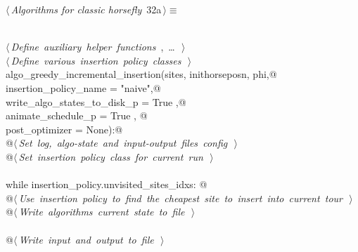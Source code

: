 \documentclass[11.5pt]{report}
\begin{document}
\begin{flushleft} \small\label{scrap33}\raggedright\small
{} $\langle\,${\itshape Algorithms for classic horsefly}\nobreak\ {\footnotesize {32a}}$\,\rangle\equiv$
\vspace{-1ex}
\begin{list}{}{} \item
\mbox{}\verb@@\\
\mbox{}\verb@@\hbox{$\langle\,${\itshape Define auxiliary helper functions}\nobreak\ {\footnotesize {}, \ldots\ }$\,\rangle$}\verb@@\\
\mbox{}\verb@@\hbox{$\langle\,${\itshape Define various insertion policy classes}\nobreak\ {\footnotesize {}}$\,\rangle$}\verb@@\\
\mbox{}\verb@def algo_greedy_incremental_insertion(sites, inithorseposn, phi,@\\
\mbox{}\verb@                                      insertion_policy_name       = "naive",@\\
\mbox{}\verb@                                      write_algo_states_to_disk_p = True   ,@\\
\mbox{}\verb@                                      animate_schedule_p          = True   , @\\
\mbox{}\verb@                                      post_optimizer              = None):@\\
\mbox{}\verb@      @\hbox{$\langle\,${\itshape Set log, algo-state and input-output files config}\nobreak\ {\footnotesize {}}$\,\rangle$}\verb@@\\
\mbox{}\verb@      @\hbox{$\langle\,${\itshape Set insertion policy class for current run}\nobreak\ {\footnotesize {}}$\,\rangle$}\verb@@\\
\mbox{}\verb@@\\
\mbox{}\verb@      while insertion_policy.unvisited_sites_idxs: @\\
\mbox{}\verb@         @\hbox{$\langle\,${\itshape Use insertion policy to find the cheapest site to insert into current tour}\nobreak\ {\footnotesize {}}$\,\rangle$}\verb@@\\
\mbox{}\verb@         @\hbox{$\langle\,${\itshape Write algorithms current state to file}\nobreak\ {\footnotesize {}}$\,\rangle$}\verb@@\\
\mbox{}\verb@@\\
\mbox{}\verb@      @\hbox{$\langle\,${\itshape Write input and output to file}\nobreak\ {\footnotesize {}}$\,\rangle$}\verb@@\\

\end{list}
\end{flushleft}
\end{document}
